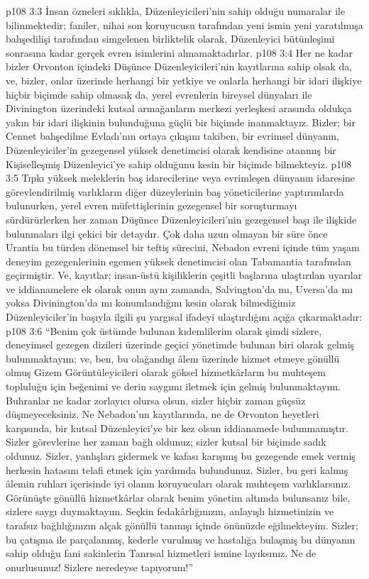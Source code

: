 \vs p108 3:3 İnsan özneleri sıklıkla, Düzenleyicileri’nin sahip olduğu numaralar ile bilinmektedir; faniler, nihai son koruyucusu tarafından yeni ismin yeni yaratılmışa bahşedilişi tarafından simgelenen birliktelik olarak, Düzenleyici bütünleşimi sonrasına kadar gerçek evren isimlerini almamaktadırlar.
\vs p108 3:4 Her ne kadar bizler Orvonton içindeki Düşünce Düzenleyicileri’nin kayıtlarına sahip olsak da, ve, bizler, onlar üzerinde herhangi bir yetkiye ve onlarla herhangi bir idari ilişkiye hiçbir biçimde sahip olmasak da, yerel evrenlerin bireysel dünyaları ile Divinington üzerindeki kutsal armağanların merkezi yerleşkesi arasında oldukça yakın bir idari ilişkinin bulunduğuna güçlü bir biçimde inanmaktayız. Bizler; bir Cennet bahşedilme Evladı’nın ortaya çıkışını takiben, bir evrimsel dünyanın, Düzenleyiciler’in gezegensel yüksek denetimcisi olarak kendisine atanmış bir Kişiselleşmiş Düzenleyici’ye sahip olduğunu kesin bir biçimde bilmekteyiz.
\vs p108 3:5 Tıpkı yüksek meleklerin baş idarecilerine veya evrimleşen dünyanın idaresine görevlendirilmiş varlıkların diğer düzeylerinin baş yöneticilerine yaptırımlarda bulunurken, yerel evren müfettişlerinin gezegensel bir soruşturmayı sürdürürlerken her zaman Düşünce Düzenleyicileri’nin gezegensel başı ile ilişkide bulunmaları ilgi çekici bir detaydır. Çok daha uzun olmayan bir süre önce Urantia bu türden dönemsel bir teftiş sürecini, Nebadon evreni içinde tüm yaşam deneyim gezegenlerinin egemen yüksek denetimcisi olan Tabamantia tarafından geçirmiştir. Ve, kayıtlar; insan\hyp{}üstü kişiliklerin çeşitli başlarına ulaştırılan uyarılar ve iddianamelere ek olarak onun aynı zamanda, Salvington’da mı, Uversa’da mı yoksa Divinington’da mı konumlandığını kesin olarak bilmediğimiz Düzenleyiciler’in başıyla ilgili şu yargısal ifadeyi ulaştırdığını açığa çıkarmaktadır:
\vs p108 3:6 “Benim çok üstümde bulunan kıdemlilerim olarak şimdi sizlere, deneyimsel gezegen dizileri üzerinde geçici yönetimde bulunan biri olarak gelmiş bulunmaktayım; ve, ben, bu olağandışı âlem üzerinde hizmet etmeye gönüllü olmuş Gizem Görüntüleyicileri olarak göksel hizmetkârların bu muhteşem topluluğu için beğenimi ve derin saygımı iletmek için gelmiş bulunmaktayım. Buhranlar ne kadar zorlayıcı olursa olsun, sizler hiçbir zaman güçsüz düşmeyeceksiniz. Ne Nebadon’un kayıtlarında, ne de Orvonton heyetleri karşısında, bir kutsal Düzenleyici’ye bir kez olsun iddianamede bulunmamıştır. Sizler görevlerine her zaman bağlı oldunuz; sizler kutsal bir biçimde sadık oldunuz. Sizler, yanlışları gidermek ve kafası karışmış bu gezegende emek vermiş herkesin hatasını telafi etmek için yardımda bulundunuz. Sizler, bu geri kalmış âlemin ruhları içerisinde iyi olanın koruyucuları olarak muhteşem varlıklarsınız. Görünüşte gönüllü hizmetkârlar olarak benim yönetim altımda bulunsanız bile, sizlere saygı duymaktayım. Seçkin fedakârlığınızın, anlayışlı hizmetinizin ve tarafsız bağlılığınızın alçak gönüllü tanınışı içinde önünüzde eğilmekteyim. Sizler; bu çatışma ile parçalanmış, kederle vurulmuş ve hastalığa bulaşmış bu dünyanın sahip olduğu fani sakinlerin Tanrısal hizmetleri ismine layıksınız. Ne de onurlusunuz! Sizlere neredeyse tapıyorum!”
